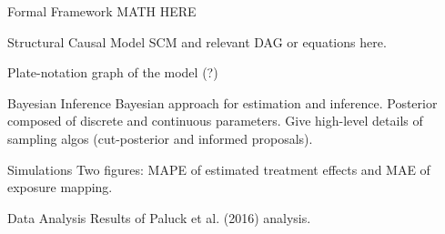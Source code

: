 \documentclass{beamer}
\begin{document}
    \begin{frame}{Formal Framework}
        MATH HERE
    \end{frame}

    \begin{frame}{Structural Causal Model}
        SCM and relevant DAG or equations here.
    \end{frame}

    \begin{frame}
        Plate-notation graph of the model (?)
    \end{frame}

    \begin{frame}{Bayesian Inference}
        Bayesian approach for estimation and inference.
        Posterior composed of discrete and continuous parameters.
        Give high-level details of sampling algos (cut-posterior and informed proposals).
    \end{frame}

    \begin{frame}{Simulations}
        Two figures: MAPE of estimated treatment effects and MAE of exposure mapping.        
    \end{frame}

    \begin{frame}{Data Analysis}
        Results of Paluck et al. (2016) analysis.
    \end{frame}
\end{document}
